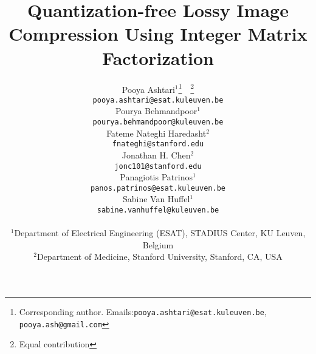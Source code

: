 \documentclass{article}
\title{Quantization-free Lossy Image Compression Using Integer Matrix Factorization}
\author{%
Pooya Ashtari$^{1}$\thanks{Corresponding author. Emails:\texttt{pooya.ashtari@esat.kuleuven.be}, \texttt{pooya.ash@gmail.com}}\ \ \thanks{Equal contribution} \\
\texttt{pooya.ashtari@esat.kuleuven.be} \\
\vspace{-20pt}
\And
Pourya Behmandpoor$^{1}$\footnotemark[2] \\
\texttt{pourya.behmandpoor@kuleuven.be} \\
\vspace{-20pt}
\And
Fateme Nateghi Haredasht$^{2}$ \\
\texttt{fnateghi@stanford.edu} \\
\vspace{-20pt}
\And
Jonathan H. Chen$^{2}$ \\
\texttt{jonc101@stanford.edu} \\
\vspace{-20pt}
\And
Panagiotis Patrinos$^{1}$ \\
\texttt{panos.patrinos@esat.kuleuven.be} \\
\And
Sabine Van Huffel$^{1}$ \\
\texttt{sabine.vanhuffel@kuleuven.be} \\
\And
\vspace{-20pt} \\
\small{$^{1}$Department of Electrical Engineering (ESAT), STADIUS Center, KU Leuven, Belgium} \\
\small{$^{2}$Department of Medicine, Stanford University, Stanford, CA, USA} \\
}
\begin{document}
\maketitle

















\medskip

{
\small


}



\appendix




\end{document}
